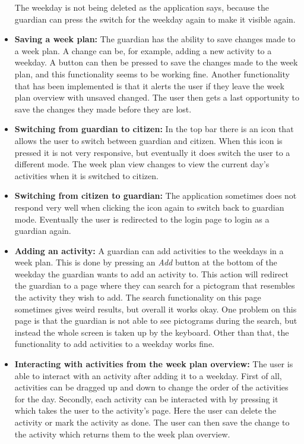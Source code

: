 \begin{itemize}
    The weekday is not being deleted as the application says, because the guardian can press the switch for the weekday again to make it visible again.
    \\
    \item \textbf{Saving a week plan:} The guardian has the ability to save changes made to a week plan.
    A change can be, for example, adding a new activity to a weekday.
    A button can then be pressed to save the changes made to the week plan, and this functionality seems to be working fine.
    Another functionality that has been implemented is that it alerts the user if they leave the week plan overview with unsaved changed.
    The user then gets a last opportunity to save the changes they made before they are lost.
    \\
    \item \textbf{Switching from guardian to citizen:} In the top bar there is an icon that allows the user to switch between guardian and citizen.
    When this icon is pressed it is not very responsive, but eventually it does switch the user to a different mode.
    The week plan view changes to view the current day's activities when it is switched to citizen.
    \\
    \item \textbf{Switching from citizen to guardian:} The application sometimes does not respond very well when clicking the icon again to switch back to guardian mode.
    Eventually the user is redirected to the login page to login as a guardian again.
    \\
    \item \textbf{Adding an activity:} A guardian can add activities to the weekdays in a week plan.
    This is done by pressing an \textit{Add} button at the bottom of the weekday the guardian wants to add an activity to.
    This action will redirect the guardian to a page where they can search for a pictogram that resembles the activity they wish to add.
    The search functionality on this page sometimes gives weird results, but overall it works okay.
    One problem on this page is that the guardian is not able to see pictograms during the search, but instead the whole screen is taken up by the keyboard.
    Other than that, the functionality to add activities to a weekday works fine.
    \\
    \item \textbf{Interacting with activities from the week plan overview:}  The user is able to interact with an activity after adding it to a weekday.
    First of all, activities can be dragged up and down to change the order of the activities for the day.
    Secondly, each activity can be interacted with by pressing it which takes the user to the activity's page.
    Here the user can delete the activity or mark the activity as done.
    The user can then save the change to the activity which returns them to the week plan overview.
    \\
\end{itemize}
